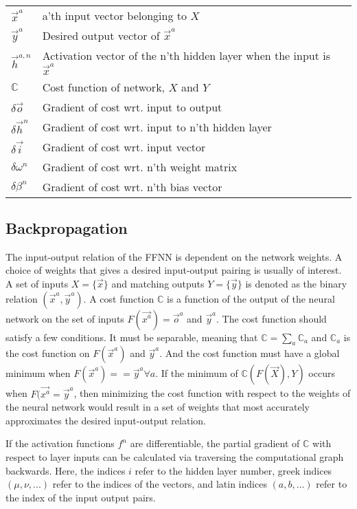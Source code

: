 \documentclass[../dissertation.tex]{subfiles}
\begin{document}
\begin{xltabular}{\linewidth}{ l | X }
    $\vec{x}^a$         & a'th input vector belonging to $X$                    \\
    $\vec{y}^a$         & Desired output vector of $\vec{x}^a$                  \\
    $\vec{h}^{a,n}$     & Activation vector of the n'th hidden layer when the input is $\vec{x}^a$ \\
    $\mathbb{C}$        & Cost function of network, $X$ and $Y$                 \\
    $\delta \vec{o}$    & Gradient of cost wrt. input to output                 \\
    $\delta \vec{h}^n$  & Gradient of cost wrt. input to n'th hidden layer      \\
    $\delta \vec{i}$    & Gradient of cost wrt. input vector                    \\
    $\delta \omega^n$   & Gradient of cost wrt. n'th weight matrix              \\
    $\delta \beta^n$    & Gradient of cost wrt. n'th bias vector
\end{xltabular}


\subsection{Backpropagation}

The input-output relation of the FFNN is dependent on the network weights.
A choice of weights that gives a desired input-output pairing is usually of interest.
A set of inputs $X = \{ \vec{x} \}$ and matching outputs $Y = \{ \vec{y} \}$ is denoted as the binary relation $( \vec{x}^a, \vec{y}^a )$.
A cost function $\mathbb{C}$ is a function of the output of the neural network on the set of inputs $F(\vec{x^a}) = \vec{o}^a$ and $\vec{y}^a$.
The cost function should satisfy a few conditions.
It must be separable, meaning that $\mathbb{C} = \sum_a \mathbb{C}_a$ and $\mathbb{C}_a$ is the cost function on $F(\vec{x}^a)$ and $\vec{y}^a$.
And the cost function must have a global minimum when $F(\vec{x}^a) == \vec{y}^a \forall a$.
If the minimum of $\mathbb{C}( F(\vec{X}), Y)$ occurs when $F(\vec{x^a} = \vec{y}^a$, then minimizing the cost function with respect to the weights of the neural network would result in a set of weights that most accurately approximates the desired input-output relation.

If the activation functions $f^n$ are differentiable, the partial gradient of $\mathbb{C}$ with respect to layer inputs can be calculated via traversing the computational graph backwards.
Here, the indices $i$ refer to the hidden layer number, greek indices $(\mu,\nu,...)$ refer to the indices of the vectors, and latin indices $(a,b,...)$ refer to the index of the input output pairs.
\end{document}
